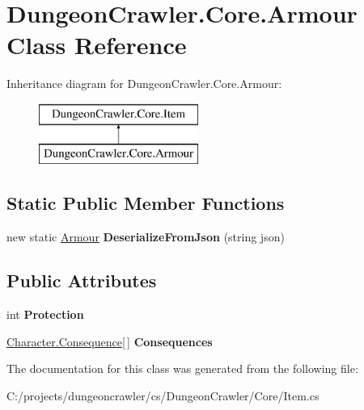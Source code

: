 \hypertarget{class_dungeon_crawler_1_1_core_1_1_armour}{}\section{Dungeon\+Crawler.\+Core.\+Armour Class Reference}
\label{class_dungeon_crawler_1_1_core_1_1_armour}
Inheritance diagram for Dungeon\+Crawler.\+Core.\+Armour\+:\begin{figure}[H]
\begin{center}
\leavevmode
\includegraphics[height=2.000000cm]{class_dungeon_crawler_1_1_core_1_1_armour}
\end{center}
\end{figure}
\subsection*{Static Public Member Functions}
\begin{DoxyCompactItemize}
\item 
\hypertarget{class_dungeon_crawler_1_1_core_1_1_armour_a67a79103dade1a8fa1898c48c87a9cba}{}new static \hyperlink{class_dungeon_crawler_1_1_core_1_1_armour}{Armour} {\bfseries Deserialize\+From\+Json} (string json)\label{class_dungeon_crawler_1_1_core_1_1_armour_a67a79103dade1a8fa1898c48c87a9cba}

\end{DoxyCompactItemize}
\subsection*{Public Attributes}
\begin{DoxyCompactItemize}
\item 
\hypertarget{class_dungeon_crawler_1_1_core_1_1_armour_a9aeafda493381b0d102f92c66d70447f}{}int {\bfseries Protection}\label{class_dungeon_crawler_1_1_core_1_1_armour_a9aeafda493381b0d102f92c66d70447f}

\item 
\hypertarget{class_dungeon_crawler_1_1_core_1_1_armour_a4c12244c933ffdac443404a509daedd1}{}\hyperlink{class_dungeon_crawler_1_1_character_1_1_consequence}{Character.\+Consequence}\mbox{[}$\,$\mbox{]} {\bfseries Consequences}\label{class_dungeon_crawler_1_1_core_1_1_armour_a4c12244c933ffdac443404a509daedd1}

\end{DoxyCompactItemize}


The documentation for this class was generated from the following file\+:\begin{DoxyCompactItemize}
\item 
C\+:/projects/dungeoncrawler/cs/\+Dungeon\+Crawler/\+Core/Item.\+cs\end{DoxyCompactItemize}
